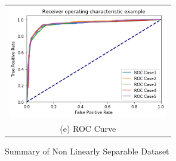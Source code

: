\begin{figure}[H]
\begin{tabular}{cc}
		
		
		
		\multicolumn{2}{c}{\includegraphics[width=70mm]{./dataset3/roc.png} }\\
		\multicolumn{2}{c}{(e) ROC Curve}
		
	\end{tabular}\hspace*{-1cm}
	\caption{Summary of Non Linearly Separable Dataset}
\end{figure}